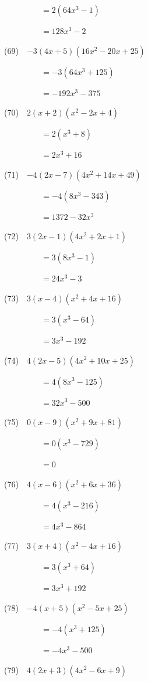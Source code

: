 \documentclass[a4j,twocolumn,10pt,fleqn]{jarticle}
\begin{document}
~~~~~~~~~$=2(64 x^{3} - 1)$

~~~~~~~~~$=128 x^{3} - 2$

(69)~~$-3\left(4 x + 5\right) \left(16 x^{2} - 20 x + 25\right)$

~~~~~~~~~$=-3(64 x^{3} + 125)$

~~~~~~~~~$=- 192 x^{3} - 375$

(70)~~$2\left(x + 2\right) \left(x^{2} - 2 x + 4\right)$

~~~~~~~~~$=2(x^{3} + 8)$

~~~~~~~~~$=2 x^{3} + 16$

(71)~~$-4\left(2 x - 7\right) \left(4 x^{2} + 14 x + 49\right)$

~~~~~~~~~$=-4(8 x^{3} - 343)$

~~~~~~~~~$=1372 - 32 x^{3}$

(72)~~$3\left(2 x - 1\right) \left(4 x^{2} + 2 x + 1\right)$

~~~~~~~~~$=3(8 x^{3} - 1)$

~~~~~~~~~$=24 x^{3} - 3$

(73)~~$3\left(x - 4\right) \left(x^{2} + 4 x + 16\right)$

~~~~~~~~~$=3(x^{3} - 64)$

~~~~~~~~~$=3 x^{3} - 192$

(74)~~$4\left(2 x - 5\right) \left(4 x^{2} + 10 x + 25\right)$

~~~~~~~~~$=4(8 x^{3} - 125)$

~~~~~~~~~$=32 x^{3} - 500$

(75)~~$0\left(x - 9\right) \left(x^{2} + 9 x + 81\right)$

~~~~~~~~~$=0(x^{3} - 729)$

~~~~~~~~~$=0$

(76)~~$4\left(x - 6\right) \left(x^{2} + 6 x + 36\right)$

~~~~~~~~~$=4(x^{3} - 216)$

~~~~~~~~~$=4 x^{3} - 864$

(77)~~$3\left(x + 4\right) \left(x^{2} - 4 x + 16\right)$

~~~~~~~~~$=3(x^{3} + 64)$

~~~~~~~~~$=3 x^{3} + 192$

(78)~~$-4\left(x + 5\right) \left(x^{2} - 5 x + 25\right)$

~~~~~~~~~$=-4(x^{3} + 125)$

~~~~~~~~~$=- 4 x^{3} - 500$

(79)~~$4\left(2 x + 3\right) \left(4 x^{2} - 6 x + 9\right)$
\end{document}
